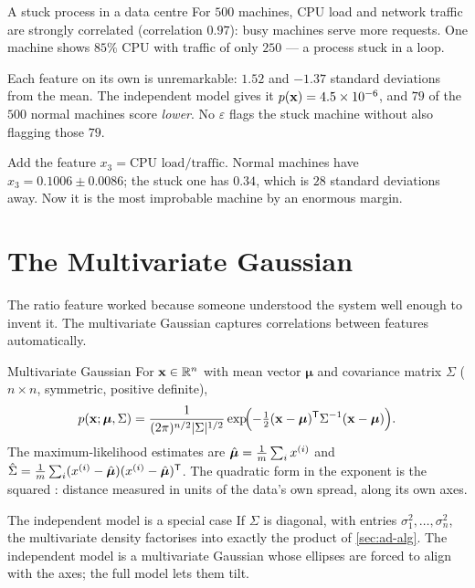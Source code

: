 \begin{workedexample}{A stuck process in a data centre}
For $500$ machines, CPU load and network traffic are strongly correlated
(correlation $0.97$): busy machines serve more requests. One machine shows
$85\%$ CPU with traffic of only $250$ --- a process stuck in a loop.

Each feature on its own is unremarkable: $1.52$ and $-1.37$ standard deviations
from the mean. The independent model gives it $p(\mathbf{x}) = 4.5\times10^{-6}$, and
$79$ of the $500$ normal machines score \emph{lower}. No $\varepsilon$ flags the
stuck machine without also flagging those $79$.

Add the feature $x_3 = \text{CPU load}/\text{traffic}$. Normal machines have
$x_3 = 0.1006 \pm 0.0086$; the stuck one has $0.34$, which is $28$ standard
deviations away. Now it is the most improbable machine by an enormous margin.
\end{workedexample}

\section{The Multivariate Gaussian}
\label{sec:multivariate}

The ratio feature worked because someone understood the system well enough to
invent it. The multivariate Gaussian captures correlations between features
automatically.

\begin{defbox}{Multivariate Gaussian}
For $\mathbf{x} \in \mathbb{R}^{n}$ with mean vector $\boldsymbol\mu$ and covariance matrix
$\Sigma$ ($n\times n$, symmetric, positive definite),
\[
  p(\mathbf{x};\boldsymbol\mu,\Sigma) = \frac{1}{(2\pi)^{n/2}|\Sigma|^{1/2}}
    \exp\!\Bigl(-\tfrac12(\mathbf{x} - \boldsymbol\mu)^{\mathsf T}\Sigma^{-1}(\mathbf{x} - \boldsymbol\mu)\Bigr).
\]
The maximum-likelihood estimates are $\hat{\boldsymbol\mu} = \frac1m\sum_ix^{(i)}$
and $\hat\Sigma = \frac1m\sum_i(x^{(i)} - \hat{\boldsymbol\mu})(x^{(i)} -
\hat{\boldsymbol\mu})^{\mathsf T}$. The quadratic form in the exponent is the
squared : distance measured in units of the data's
own spread, along its own axes.
\end{defbox}

\begin{keyinsight}{The independent model is a special case}
If $\Sigma$ is diagonal, with entries $\sigma_1^2,\dots,\sigma_n^2$, the
multivariate density factorises into exactly the product of \cref{sec:ad-alg}.
The independent model is a multivariate Gaussian whose ellipses are forced to
align with the axes; the full model lets them tilt.
\end{keyinsight}


